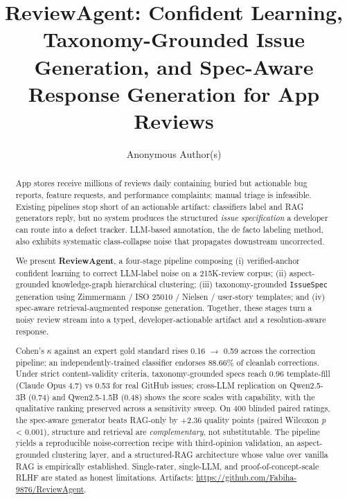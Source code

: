 \documentclass[sigconf, nonacm, anonymous, balance=false]{acmart}
\begin{document}
\title{ReviewAgent: Confident Learning, Taxonomy-Grounded Issue Generation, and Spec-Aware Response Generation for App Reviews}
\author{Anonymous Author(s)}
\renewcommand{\shortauthors}{Anonymous}
\begin{abstract}\label{abstract}

App stores receive millions of reviews daily containing buried but actionable bug reports, feature requests, and performance complaints; manual triage is infeasible. Existing pipelines stop short of an actionable artifact: classifiers label and RAG generators reply, but no system produces the structured \emph{issue specification} a developer can route into a defect tracker. LLM-based annotation, the de facto labeling method, also exhibits systematic class-collapse noise that propagates downstream uncorrected.

We present \textbf{ReviewAgent}, a four-stage pipeline composing (i) verified-anchor confident learning to correct LLM-label noise on a 215K-review corpus; (ii) aspect-grounded knowledge-graph hierarchical clustering; (iii) taxonomy-grounded \texttt{IssueSpec} generation using Zimmermann / ISO 25010 / Nielsen / user-story templates; and (iv) spec-aware retrieval-augmented response generation. Together, these stages turn a noisy review stream into a typed, developer-actionable artifact and a resolution-aware response.

Cohen's $\kappa$ against an expert gold standard rises 0.16 $\rightarrow$ 0.59 across the correction pipeline; an independently-trained classifier endorses 88.66\% of cleanlab corrections. Under strict content-validity criteria, taxonomy-grounded specs reach 0.96 template-fill (Claude Opus 4.7) vs 0.53 for real GitHub issues; cross-LLM replication on Qwen2.5-3B (0.74) and Qwen2.5-1.5B (0.48) shows the score scales with capability, with the qualitative ranking preserved across a sensitivity sweep. On 400 blinded paired ratings, the spec-aware generator beats RAG-only by +2.36 quality points (paired Wilcoxon \emph{p} \textless{} 0.001), structure and retrieval are \emph{complementary}, not substitutable. The pipeline yields a reproducible noise-correction recipe with third-opinion validation, an aspect-grounded clustering layer, and a structured-RAG architecture whose value over vanilla RAG is empirically established. Single-rater, single-LLM, and proof-of-concept-scale RLHF are stated as honest limitations. Artifacts: \url{https://github.com/Fabiha-9876/ReviewAgent}.


\end{abstract}
\end{document}
